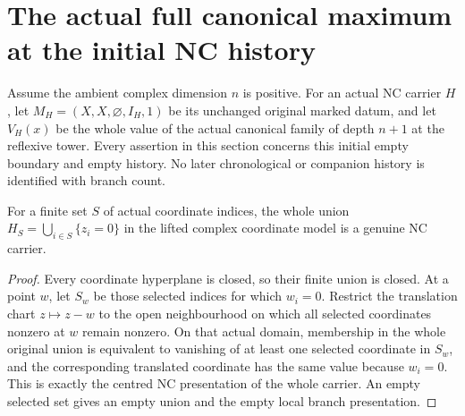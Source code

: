 \section{The actual full canonical maximum at the initial NC history}
\label{sec:hironaka-normal-crossings-initial-full-maximum}

Assume the ambient complex dimension $n$ is positive. For an actual NC
carrier $H$, let $M_H=(X,X,\varnothing,I_H,1)$ be its unchanged original
marked datum, and let $V_H(x)$ be the whole value of the actual canonical
family of depth $n+1$ at the reflexive tower. Every assertion in this
section concerns this initial empty boundary and empty history. No
later chronological or companion history is identified with branch count.

\begin{lemma}
\label{hir:general-nc-standard-coordinate-carrier}
\leanok
{}
For a finite set $S$ of actual coordinate indices, the whole union
$H_S=\bigcup_{i\in S}\{z_i=0\}$ in the lifted complex coordinate model
is a genuine NC carrier.
\end{lemma}
\begin{proof}
Every coordinate hyperplane is closed, so their finite union is closed.
At a point $w$, let $S_w$ be those selected
indices for which $w_i=0$. Restrict the translation chart $z\mapsto z-w$
to the open neighbourhood on which all selected coordinates nonzero
at $w$ remain nonzero. On that actual domain, membership in the whole
original union is equivalent to vanishing of at least one selected
coordinate in $S_w$, and the corresponding translated coordinate has
the same value because $w_i=0$. This is exactly the centred NC
presentation of the whole carrier. An empty selected set gives an
empty union and the empty local branch presentation.
\end{proof}

